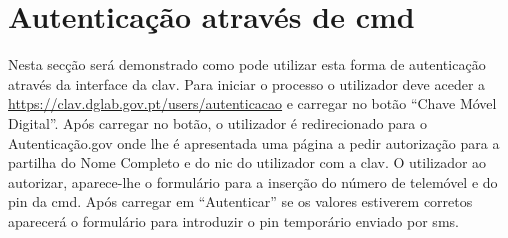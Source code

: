 \section{Autenticação através de \acrshort{cmd}}

Nesta secção será demonstrado como pode utilizar esta forma de autenticação através da interface da \acrshort{clav}. Para iniciar o processo o utilizador deve aceder a \url{https://clav.dglab.gov.pt/users/autenticacao} e carregar no botão ``Chave Móvel Digital''. Após carregar no botão, o utilizador é redirecionado para o Autenticação.gov onde lhe é apresentada uma página a pedir autorização para a partilha do Nome Completo e do \acrshort{nic} do utilizador com a \acrshort{clav}. O utilizador ao autorizar, aparece-lhe o formulário para a inserção do número de telemóvel e do \acrshort{pin} da \acrshort{cmd}. Após carregar em ``Autenticar'' se os valores estiverem corretos aparecerá o formulário para introduzir o \acrshort{pin} temporário enviado por \acrshort{sms}.

